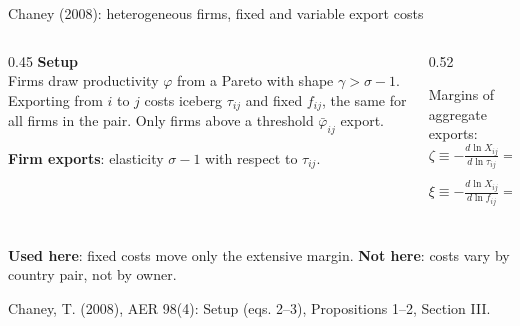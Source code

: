 \documentclass[11pt,aspectratio=169,notes]{beamer}
\newcommand{\src}[1]{\par\vfill{\color{mute}\scriptsize #1\par}}
\begin{document}
\begin{frame}{Chaney (2008): heterogeneous firms, fixed and variable export costs}
\vspace{0.15cm}
\begin{columns}[T]
\begin{column}{0.45\textwidth}
\textbf{Setup}\\[0.1em]
{\footnotesize Firms draw productivity $\varphi$ from a Pareto with shape $\gamma>\sigma-1$. Exporting from $i$ to $j$ costs iceberg $\tau_{ij}$ and fixed $f_{ij}$, the same for all firms in the pair. Only firms above a threshold $\bar\varphi_{ij}$ export.}
\vspace{0.2cm}

\textbf{Firm exports}: elasticity $\sigma-1$ with respect to $\tau_{ij}$.
\end{column}
\begin{column}{0.52\textwidth}
\begin{mathbox}
\footnotesize Margins of aggregate exports:
\[
\zeta\equiv-\tfrac{d\ln X_{ij}}{d\ln\tau_{ij}}=\underbrace{\sigma-1}_{\text{int.}}+\underbrace{\gamma-(\sigma-1)}_{\text{ext.}}=\gamma
\]
\[
\xi\equiv-\tfrac{d\ln X_{ij}}{d\ln f_{ij}}=\underbrace{0}_{\text{int.}}+\underbrace{\tfrac{\gamma}{\sigma-1}-1}_{\text{ext.}}
\]
\end{mathbox}
\end{column}
\end{columns}
\vspace{0.15cm}
{\small\textbf{Used here}: fixed costs move only the extensive margin. \textbf{Not here}: costs vary by country pair, not by owner.}
\src{Chaney, T. (2008), AER 98(4): Setup (eqs. 2--3), Propositions 1--2, Section III.}
\end{frame}
\end{document}
